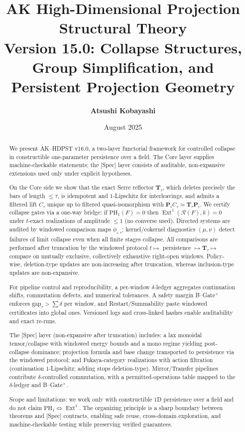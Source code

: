 \documentclass[11pt]{article}
\title{AK High-Dimensional Projection Structural Theory\\
\Large Version 15.0: Collapse Structures, Group Simplification, and Persistent Projection Geometry}
\author{\textbf{Atsushi Kobayashi} \quad {\small (with ChatGPT Research Partner)}}
\date{August 2025}
\numberwithin{equation}{section}
\theoremstyle{plain}
\theoremstyle{definition}
\theoremstyle{remark}
\theoremstyle{plain}
\theoremstyle{definition}
\numberwithin{equation}{section}
\theoremstyle{definition}
\numberwithin{equation}{section}
\theoremstyle{plain}
\theoremstyle{definition}
\theoremstyle{remark}
\begin{document}
\maketitle



\begin{abstract}
We present AK--HDPST v16.0, a two-layer functorial framework for controlled collapse in constructible one-parameter persistence over a field. The Core layer supplies machine-checkable statements; the [Spec] layer consists of auditable, non-expansive extensions used only under explicit hypotheses.

On the Core side we show that the exact Serre reflector \(\mathbf{T}_\tau\), which deletes precisely the bars of length \(\le \tau\), is idempotent and \(1\)-Lipschitz for interleavings, and admits a filtered lift \(C_\tau\) unique up to filtered quasi-isomorphism with \(\mathbf{P}_i C_\tau \simeq \mathbf{T}_\tau \mathbf{P}_i\). We certify collapse gates via a one-way bridge: if \(\mathrm{PH}_1(F)=0\) then \(\operatorname{Ext}^1(\mathcal{R}(F),k)=0\) under \(t\)-exact realizations of amplitude \(\le 1\) (no converse used). Directed systems are audited by windowed comparison maps \(\phi_{i,\tau}\); kernel/cokernel diagnostics \((\mu,\nu)\) detect failures of limit collapse even when all finite stages collapse. All comparisons are performed after truncation by the windowed protocol \(t \mapsto\) persistence \(\mapsto \mathbf{T}_\tau \mapsto\) compare on mutually exclusive, collectively exhaustive right-open windows. Policy-wise, deletion-type updates are non-increasing after truncation, whereas inclusion-type updates are non-expansive.

For pipeline control and reproducibility, a per-window \(\delta\)-ledger aggregates continuation shifts, commutation defects, and numerical tolerances. A safety margin B--Gate\(^{+}\) enforces \(\mathrm{gap}_\tau > \sum \delta\) per window, and Restart/Summability paste windowed certificates into global ones. Versioned logs and cross-linked hashes enable auditability and exact re-runs.

The [Spec] layer (non-expansive after truncation) includes: a lax monoidal tensor/collapse with windowed energy bounds and a mono regime yielding post-collapse dominance; projection formula and base change transported to persistence via the windowed protocol; and Fukaya-category realizations with action filtration (continuation \(1\)-Lipschitz; adding stops deletion-type). Mirror/Transfer pipelines contribute \(\delta\)-controlled commutation, with a permitted-operations table mapped to the \(\delta\)-ledger and B--Gate\(^{+}\).

Scope and limitations: we work only with constructible \(1\)D persistence over a field and do not claim \(\mathrm{PH}_1 \Leftrightarrow \operatorname{Ext}^1\). The organizing principle is a sharp boundary between theorems and [Spec] contracts, enabling safe reuse, cross-domain exploration, and machine-checkable testing while preserving verified guarantees.
\end{abstract}
\end{document}
